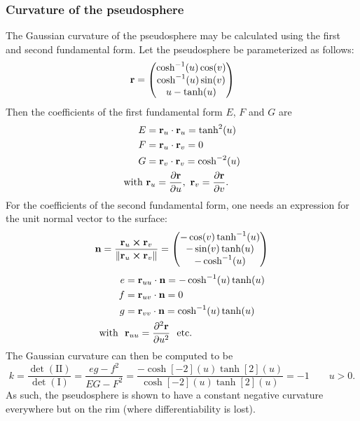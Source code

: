 \subsubsection{Curvature of the pseudosphere}
The Gaussian curvature of the pseudosphere may be calculated using the first and second fundamental form. Let the pseudosphere be parameterized as follows: 
$$ \vb{r} = \mqty(\cosh[-1](u)\cos(v)\\
                  \cosh[-1](u)\sin(v)\\
                  u - \tanh(u)) $$
Then the coefficients of the first fundamental form $E$, $F$ and $G$ are
\begin{equation*}
    \begin{split}
        E &= \vb{r}_u \cdot \vb{r}_u = \tanh[2](u) \\
        F &= \vb{r}_u \cdot \vb{r}_v = 0 \\
        G &= \vb{r}_v \cdot \vb{r}_v = \cosh[-2](u) \\
        \text{with } & \vb{r}_u = \pdv{\vb{r}}{u},\ \vb{r}_v = \pdv{\vb{r}}{v}.
    \end{split}
\end{equation*}
For the coefficients of the second fundamental form, one needs an expression for the unit normal vector to the surface:
$$ 
    \vb{n} =  \frac{\vb{r}_u \cross \vb{r}_v}{\norm{\vb{r}_u \cross \vb{r}_v}} 
    = \mqty(-\cos(v)\tanh[-1](u) \\
            -\sin(v)\tanh(u)\\
            -\cosh[-1](u)\\
            )
$$
\begin{equation*}
    \begin{split}
        e &= \vb{r}_{uu} \cdot \vb{n} = -\cosh[-1](u)\tanh(u)\\
        f &= \vb{r}_{uv} \cdot \vb{n} = 0\\
        g &= \vb{r}_{vv} \cdot \vb{n} = \cosh[-1](u)\tanh(u)\\
        \text{with }\ & \vb{r}_{uu} = \pdv[2]{\vb{r}}{u}\ \text{ etc.}
    \end{split}
\end{equation*}
The Gaussian curvature can then be computed to be \cite{ONeill2006}
\begin{equation}
    k = \frac{\det(\mathrm{II})}{\det(\mathrm{I})} = \frac{eg - f^2}{EG - F^2} = \frac{-\cosh[-2](u)\tanh[2](u)}{\cosh[-2](u)\tanh[2](u)} = -1 \qquad u > 0.
\end{equation}
As such, the pseudosphere is shown to have a constant negative curvature everywhere but on the rim (where differentiability is lost).

